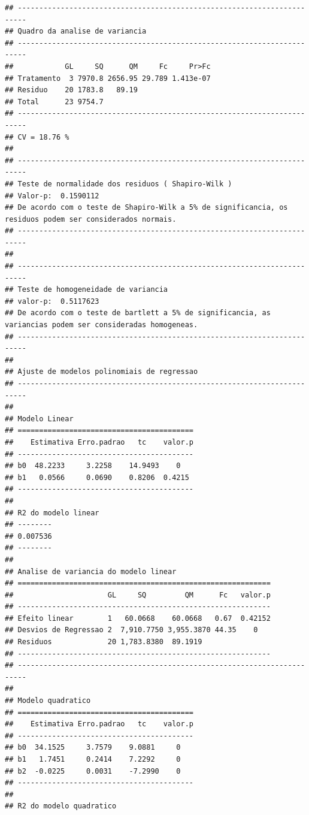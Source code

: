 \documentclass[
]{article}
\begin{document}
\begin{verbatim}
## ------------------------------------------------------------------------
## Quadro da analise de variancia
## ------------------------------------------------------------------------
##            GL     SQ      QM     Fc     Pr>Fc
## Tratamento  3 7970.8 2656.95 29.789 1.413e-07
## Residuo    20 1783.8   89.19                 
## Total      23 9754.7                         
## ------------------------------------------------------------------------
## CV = 18.76 %
## 
## ------------------------------------------------------------------------
## Teste de normalidade dos residuos ( Shapiro-Wilk ) 
## Valor-p:  0.1590112 
## De acordo com o teste de Shapiro-Wilk a 5% de significancia, os residuos podem ser considerados normais.
## ------------------------------------------------------------------------
## 
## ------------------------------------------------------------------------
## Teste de homogeneidade de variancia 
## valor-p:  0.5117623 
## De acordo com o teste de bartlett a 5% de significancia, as variancias podem ser consideradas homogeneas.
## ------------------------------------------------------------------------
## 
## Ajuste de modelos polinomiais de regressao
## ------------------------------------------------------------------------
## 
## Modelo Linear
## =========================================
##    Estimativa Erro.padrao   tc    valor.p
## -----------------------------------------
## b0  48.2233     3.2258    14.9493    0   
## b1   0.0566     0.0690    0.8206  0.4215 
## -----------------------------------------
## 
## R2 do modelo linear
## --------
## 0.007536
## --------
## 
## Analise de variancia do modelo linear
## ===========================================================
##                      GL     SQ         QM      Fc   valor.p
## -----------------------------------------------------------
## Efeito linear        1   60.0668    60.0668   0.67  0.42152
## Desvios de Regressao 2  7,910.7750 3,955.3870 44.35    0   
## Residuos             20 1,783.8380  89.1919                
## -----------------------------------------------------------
## ------------------------------------------------------------------------
## 
## Modelo quadratico
## =========================================
##    Estimativa Erro.padrao   tc    valor.p
## -----------------------------------------
## b0  34.1525     3.7579    9.0881     0   
## b1   1.7451     0.2414    7.2292     0   
## b2  -0.0225     0.0031    -7.2990    0   
## -----------------------------------------
## 
## R2 do modelo quadratico

\end{verbatim}
\end{document}
